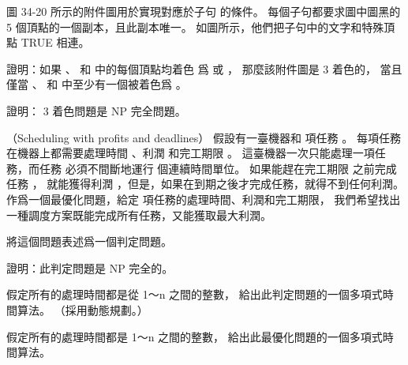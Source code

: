 \startANSWER
{}
\stopANSWER

圖 34-20 所示的附件圖用於實現對應於子句  的條件。
每個子句都要求圖中圖黑的 5 個頂點的一個副本，且此副本唯一。
如圖所示，他們把子句中的文字和特殊頂點 TRUE 相連。

\startigBase[continue]\startitem
證明：如果 、  和  中的每個頂點均着色
爲  或 ，
那麼該附件圖是 3 着色的，
當且僅當 、  和  中至少有一個被着色爲 。
\stopitem\stopigBase

\startANSWER
{}
\stopANSWER

\startigBase[continue]\startitem
證明： 3 着色問題是 NP 完全問題。
\stopitem\stopigBase

\startANSWER
{}
\stopANSWER
\stopPROBLEM

\startPROBLEM
（Scheduling with profits and deadlines）
假設有一臺機器和  項任務 。
每項任務  在機器上都需要處理時間 、利潤  和完工期限 。
這臺機器一次只能處理一項任務，而任務  必須不間斷地運行  個連續時間單位。
如果能趕在完工期限  之前完成任務 ，
就能獲得利潤 ，但是，如果在到期之後才完成任務，就得不到任何利潤。
作爲一個最優化問題，給定  項任務的處理時間、利潤和完工期限，
我們希望找出一種調度方案既能完成所有任務，又能獲取最大利潤。

\startigBase[a]\startitem
將這個問題表述爲一個判定問題。
\stopitem\stopigBase

\startANSWER
{}
\stopANSWER

\startigBase[continue]\startitem
證明：此判定問題是 NP 完全的。
\stopitem\stopigBase

\startANSWER
{}
\stopANSWER

\startigBase[continue]\startitem
假定所有的處理時間都是從 1～n 之間的整數，
給出此判定問題的一個多項式時間算法。
（\hint 採用動態規劃。）
\stopitem\stopigBase

\startANSWER
{}
\stopANSWER

\startigBase[continue]\startitem
假定所有的處理時間都是 1～n 之間的整數，
給出此最優化問題的一個多項式時間算法。
\stopitem\stopigBase

\startANSWER
{}
\stopANSWER
\stopPROBLEM

\stopsubject%
